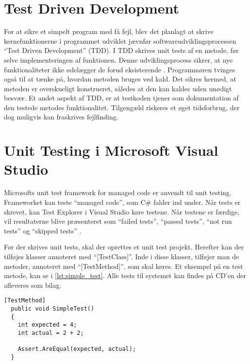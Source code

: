 \section{Test Driven Development}
\label{sub:test_driven_development}

For at sikre et simpelt program med få fejl, blev det planlagt at skrive kernefunktionerne i programmet udviklet jævnfør softwareudviklingsprocessen \enquote{Test Driven Development} (TDD). I TDD skrives unit tests af en metode, før selve implementeringen af funktionen. Denne udviklingsprocess sikrer, at nye funktionaliteter ikke ødelægger de forud eksisterende \cite{martin2006agile}. Programmøren tvinges også til at tænke på, hvordan metoden bruges ved kald. Det sikres hermed, at metoden er overskueligt konstrueret, således at den kan kaldes uden unødigt besvær. Et andet aspekt af TDD, er at testkoden tjener som dokumentation af den testede metodes funktionalitet. Tilgengæld riskeres et øget tidsforbrug, der dog muligvis kan fraskrives fejlfinding.

\section{Unit Testing i Microsoft Visual Studio}
\label{sub:unit_testing_i_microsoft_visual_studio}

Microsofts unit test framework for managed code er anvendt til unit testing. Frameworket kan teste \enquote{managed code}, som C\# falder ind under. Når tests er skrevet, kan Test Explorer i Visual Studio køre testene. Når testene er færdige, vil resultaterne blive præsenteret som \enquote{failed tests}, \enquote{passed tests}, \enquote{not run tests} og \enquote{skipped tests} \cite{msdn_unittest}.

Før der skrives unit tests, skal der oprettes et unit test projekt. Herefter kan der tilføjes klasser annoteret med \enquote{[TestClass]}. Inde i disse klasser, tilføjer man de metoder, annoteret med \enquote{[TestMethod]}, som skal køres. Et eksempel på en test metode, kan se i \cref{lst:simple_test}.
Alle tests til systemet kan findes på CD'en der afleveres som bilag.

\begin{lstlisting}[label=lst:simple_test, caption={Eksempel på testfunktion}]
  [TestMethod]
  public void SimpleTest()
  {
    int expected = 4;
    int actual = 2 + 2;

    Assert.AreEqual(expected, actual);
  }
\end{lstlisting}

